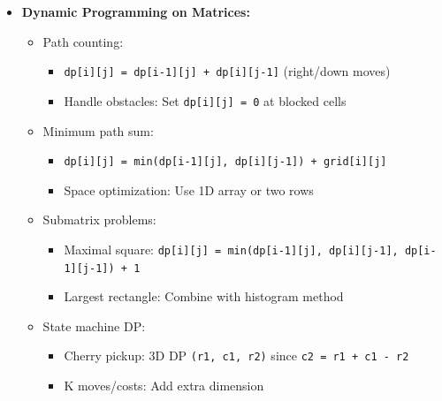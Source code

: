 \documentclass[a4paper,10pt]{book}
\begin{document}
\begin{itemize}
    \item \textbf{Dynamic Programming on Matrices:}
    \begin{itemize}
        \item Path counting: 
        \begin{itemize}
            \item \texttt{dp[i][j] = dp[i-1][j] + dp[i][j-1]} (right/down moves)
            \item Handle obstacles: Set \texttt{dp[i][j] = 0} at blocked cells
        \end{itemize}
        \item Minimum path sum: 
        \begin{itemize}
            \item \texttt{dp[i][j] = min(dp[i-1][j], dp[i][j-1]) + grid[i][j]}
            \item Space optimization: Use 1D array or two rows
        \end{itemize}
        \item Submatrix problems: 
        \begin{itemize}
            \item Maximal square: \texttt{dp[i][j] = min(dp[i-1][j], dp[i][j-1], dp[i-1][j-1]) + 1}
            \item Largest rectangle: Combine with histogram method
        \end{itemize}
        \item State machine DP: 
        \begin{itemize}
            \item Cherry pickup: 3D DP \texttt{(r1, c1, r2)} since \texttt{c2 = r1 + c1 - r2}
            \item K moves/costs: Add extra dimension
        \end{itemize}
    \end{itemize}
    

\end{itemize}
\end{document}
